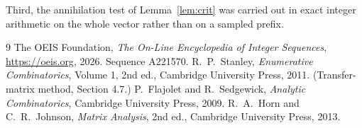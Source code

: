 \documentclass[11pt,a4paper]{article}
\theoremstyle{plain}
\theoremstyle{definition}
\begin{document}
Third, the annihilation test of Lemma~\ref{lem:crit} was carried out in exact integer
arithmetic on the whole vector rather than on a sampled prefix.

\begin{thebibliography}{9}
 The OEIS Foundation, \emph{The On-Line Encyclopedia of Integer
Sequences}, \url{https://oeis.org}, 2026. Sequence A221570.
 R.~P.~Stanley, \emph{Enumerative Combinatorics}, Volume 1, 2nd ed.,
Cambridge University Press, 2011. (Transfer-matrix method, Section 4.7.)
 P.~Flajolet and R.~Sedgewick, \emph{Analytic Combinatorics}, Cambridge
University Press, 2009.
 R.~A.~Horn and C.~R.~Johnson, \emph{Matrix Analysis}, 2nd ed., Cambridge
University Press, 2013.
\end{thebibliography}
\end{document}
